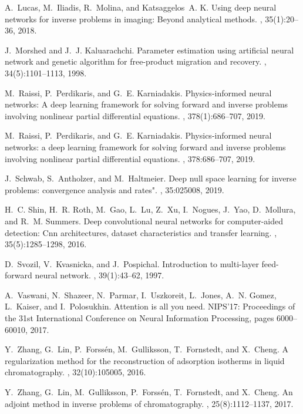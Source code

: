 \documentclass[thmsa,onecolumn,12pt]{article}%
\begin{document}
\begin{thebibliography}{99}
A.~Lucas, M.~Iliadis, R.~Molina, and Katsaggelos~A. K.
\newblock Using deep neural networks for inverse problems in imaging: Beyond
  analytical methods.
, 35(1):20--36, 2018.

J.~Morshed and J.~J. Kaluarachchi.
\newblock Parameter estimation using artificial neural network and genetic
  algorithm for free-product migration and recovery.
, 34(5):1101--1113, 1998.

M.~Raissi, P.~Perdikaris, and G.~E. Karniadakis.
\newblock Physics-informed neural networks: A deep learning framework for
  solving forward and inverse problems involving nonlinear partial differential
  equations.
, 378(1):686--707, 2019.

M.~Raissi, P.~Perdikaris, and G.~E. Karniadakis.
\newblock Physics-informed neural networks: a deep learning framework for
  solving forward and inverse problems involving nonlinear partial differential
  equations.
, 378:686--707, 2019.

J.~Schwab, S.~Antholzer, and M.~Haltmeier.
\newblock Deep null space learning for inverse problems: convergence analysis
  and rates".
, 35:025008, 2019.

H.~C. Shin, H.~R. Roth, M.~Gao, L.~Lu, Z.~Xu, I.~Nogues, J.~Yao, D.~Mollura,
  and R.~M. Summers.
\newblock Deep convolutional neural networks for computer-aided detection: Cnn
  architectures, dataset characteristics and transfer learning.
, 35(5):1285--1298, 2016.

D.~Svozil, V.~Kvasnicka, and J.~Pospichal.
\newblock Introduction to multi-layer feed-forward neural network.
, 39(1):43--62,
  1997.

A.~Vaswani, N.~Shazeer, N.~Parmar, I.~Uszkoreit, L.~Jones, A.~N. Gomez,
  L.~Kaiser, and I.~Polosukhin.
\newblock Attention is all you need.
\newblock NIPS'17: Proceedings of the 31st International Conference on Neural
  Information Processing, pages 6000--60010, 2017.

Y.~Zhang, G.~Lin, P.~Forss{\'e}n, M.~Gulliksson, T.~Fornstedt, and X.~Cheng.
\newblock A regularization method for the reconstruction of adsorption
  isotherms in liquid chromatography.
, 32(10):105005, 2016.

Y.~Zhang, G.~Lin, M.~Gulliksson, P.~Forss{\'e}n, T.~Fornstedt, and X.~Cheng.
\newblock An adjoint method in inverse problems of chromatography.
, 25(8):1112--1137,
  2017.
\end{thebibliography}
\end{document}
